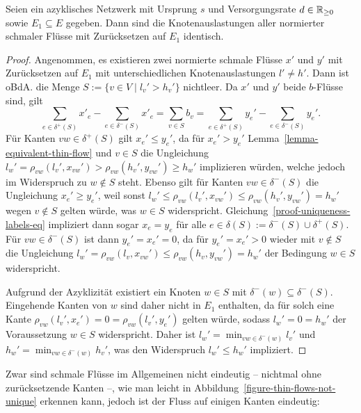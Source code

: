 \begin{lemma}\label{lemma-node-congestion-unique}
	Seien ein azyklisches Netzwerk mit Ursprung $s$ und Versorgungsrate $d\in\mathbb{R}_{\geq 0}$ sowie $E_1\subseteq E$ gegeben.
	Dann sind die Knotenauslastungen aller normierter schmaler Flüsse mit Zurücksetzen auf $E_1$ identisch.
\end{lemma}
\begin{proof}
	Angenommen, es existieren zwei normierte schmale Flüsse $x'$ und $y'$ mit Zurück\-setzen auf $E_1$ mit unterschiedlichen Knotenauslastungen $l'\neq h'$.
	Dann ist oBdA. die Menge $S:=\{ v\in V \mid l_v' > h_v' \}$ nichtleer.
	Da $x'$ und $y'$ beide $b$-Flüsse sind, gilt 
	\begin{equation}\label{proof-uniqueness-labels-eq}
	\sum_{e\in \delta^+(S)} x'_e - \sum_{e\in\delta^-(S)} x'_e = \sum_{v\in S} b_v = \sum_{e\in\delta^+(S)} y_e' - \sum_{e\in\delta^-(S)} y_e'.
	\end{equation}
	Für Kanten $vw\in \delta^+(S)$ gilt $x_e' \leq y_e'$, da für $x_e' > y_e'$ Lemma~\ref{lemma-equivalent-thin-flow} und $v\in S$ die Ungleichung $l_w' = \rho_{vw}(l_v', x_{vw}') > \rho_{vw}(h_v', y_{vw}')\geq h_w'$ implizieren würden, welche jedoch im Widerspruch zu $w\notin S$ steht.
	Ebenso gilt für Kanten $vw\in\delta^-(S)$ die Ungleichung $x_e' \geq y_e'$, weil sonst $l_w' \leq \rho_{vw}(l_v', x_{vw}') \leq \rho_{vw}(h_v', y_{vw}') = h_w'$ wegen $v\notin S$ gelten würde, was $w\in S$ widerspricht.
	Gleichung~\ref{proof-uniqueness-labels-eq} impliziert dann sogar $x_e = y_e$ für alle $e\in \delta(S):=\delta^-(S) \cup \delta^+(S)$.
	Für $vw\in \delta^-(S)$ ist dann $y_e'=x_e'=0$, da für $y_e'=x_e'>0$ wieder mit $v\notin S$ die Ungleichung $l_w' = \rho_{vw}(l_v, x_{vw}')\leq \rho_{vw}(h_v, y_{vw}')=h_w'$ der Bedingung $w\in S$ widerspricht.
	
	Aufgrund der Azyklizität existiert ein Knoten $w\in S$ mit $\delta^-(w)\subseteq \delta^-(S)$.
	Eingehende Kanten von $w$ sind daher nicht in $E_1$ enthalten, da für solch eine Kante $\rho_{vw}(l_v', x_e') = 0 = \rho_{vw}(l_v', y_e')$ gelten würde, sodass $l_w' = 0 = h_w'$ der Voraussetzung $w\in S$ widerspricht.
	Daher ist $l_w' = \min_{vw\in \delta^-(w)} l_v'$ und $h_w' = \min_{vw\in\delta^-(w)} h_v'$, was den Widerspruch $l_w' \leq h_w'$ impliziert.
\end{proof}

Zwar sind schmale Flüsse im Allgemeinen nicht eindeutig -- nichtmal ohne zurück\-setzende Kanten --, wie man leicht in Abbildung~\ref{figure-thin-flows-not-unique} erkennen kann, jedoch ist der Fluss auf einigen Kanten eindeutig:

